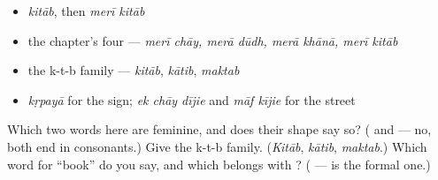 \begin{itemize}
\raggedright
  \item \emph{kitāb}, then \emph{merī kitāb}
  \item the chapter's four — \emph{merī chāy, merā dūdh, merā khānā, merī kitāb}
  \item the k-t-b family — \emph{kitāb}, \emph{kātib}, \emph{maktab}
  \item \emph{kṛpayā} for the sign; \emph{ek chāy dījie} and \emph{māf kījie} for the street
\end{itemize}

\begin{tcolorbox}[breakable,colback=teal!4,colframe=teal!35!black,title={Before you move on}]
Which two words here are feminine, and does their shape say so? (\textbf{} and \textbf{} — no, both end in consonants.) Give the k-t-b family. (\emph{Kitāb}, \emph{kātib}, \emph{maktab}.) Which word for \textquotedblleft{}book\textquotedblright{} do you say, and which belongs with \textbf{}? (\textbf{} — \textbf{} is the formal one.)
\end{tcolorbox}
